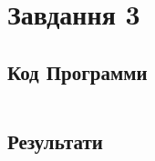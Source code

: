 \section{Завдання 3}
\label{sec:task3}

\subsection{Код Программи}
\label{subsec:task3_code}
\inputminted{python}{../src/task3.py}

\subsection{Результати}
\label{subsec:task3_results}
